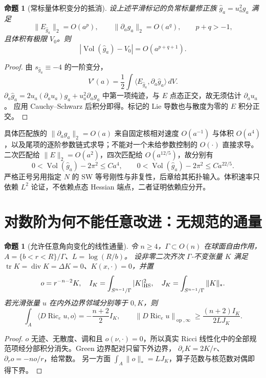 \documentclass[UTF8,fontset=fandol,zihao=-4,oneside,openany]{ctexbook}
\theoremstyle{cjkplain}
\newtheorem{proposition}[theorem]{命题}
\numberwithin{equation}{chapter}
\DeclareMathOperator{\Ric}{Ric}
\DeclareMathOperator{\Vol}{Vol}
\DeclareMathOperator{\tr}{tr}
\begin{document}
\begin{proposition}[常标量体积变分的抵消]\label{FND:volumevariation}
设上述平滑标记的负常标量修正族
\(\widehat g_a=u_a^2g_a\) 满足
\[
\|E_{\widehat g_a}\|_2=O(a^p),\qquad
\|\partial_ag_a\|_2=O(a^q),\qquad p+q>-1,
\]
且体积有极限 \(V_0\)。则
\[
|\Vol(\widehat g_a)-V_0|=O(a^{p+q+1}).
\]
\end{proposition}
\begin{proof}
由 \(s_{\widehat g_a}\equiv-4\) 的一阶变分，
\[
V'(a)=\frac12\int
\langle E_{\widehat g_a},\partial_a\widehat g_a\rangle\,dV .
\]
\(\partial_a\widehat g_a=
2u_a(\partial_au_a)g_a+u_a^2\partial_ag_a\) 中第一项纯迹，与 \(E\) 点态正交，故无须估计 \(\partial_au_a\)。
应用 Cauchy--Schwarz 后积分即得。标记的 Lie 导数也与散度为零的 \(E\) 积分正交。
\end{proof}
具体匹配族的 \(\|\partial_ag_a\|_2=O(a)\) 来自固定核相对速度 \(O(a^{-1})\) 与体积 \(O(a^4)\)，以及尾项的逐阶参数链式求导；不能对一个未给参数控制的 \(O(\cdot)\) 直接求导。
二次匹配给 \(\|E\|_2=O(a^2)\)，四次匹配给 \(O(a^{12/5})\)，故分别有
\[
0<\Vol(\widehat g_a)-2\pi^2\le Ca^4,\qquad
0<\Vol(\widehat g_a)-2\pi^2\le Ca^{22/5}.
\]
严格正号另用指定 \(N\) 的 SW 等号刚性与非复性，后章给其拓扑输入。体积速率只依赖 \(L^2\) 论证，不依赖点态 Hessian 端点，二者证明依赖应分开。

\section{对数阶为何不能任意改进：无规范的通量}
\begin{proposition}[允许任意角向变化的线性通量]\label{FND:flux}
令 \(n\ge4\)，\(\Gamma\subset O(n)\) 在球面自由作用，
\(A=\{b<r<R\}/\Gamma\)、\(L=\log(R/b)\)。
设非零二次齐次 \(\Gamma\)-不变张量 \(K\) 满足
\(\tr K=\operatorname{div}K=\Delta K=0\)、\(K(x,\cdot)=0\)，并置
\[
o=r^{-n-2}K,\quad
I_K=\int_{S^{n-1}/\Gamma}|K|_{\rm HS}^2,\quad
J_K=\int_{S^{n-1}/\Gamma}\|K\|_* .
\]
若光滑张量 \(u\) 在内外边界邻域分别等于 \(0,K\)，则
\[
\int_A\langle D\Ric_eu,o\rangle=-\frac{n+2}{2}I_K,
\qquad
\|D\Ric_eu\|_{\operatorname{op},\infty}
\ge\frac{(n+2)I_K}{2LJ_K}.
\]
\end{proposition}
\begin{proof}
\(o\) 无迹、无散度、调和且 \(o(\nu,\cdot)=0\)，所以真实 Ricci 线性化中的全部规范项经分部积分消失。Green 边界配对只留下外边界，
\(\partial_rK=2K/r\)、\(\partial_ro=-no/r\)，给常数。
另一方面 \(\int_A\|o\|_*=LJ_K\)，算子范数与核范数对偶即得下界。
\end{proof}
\end{document}
